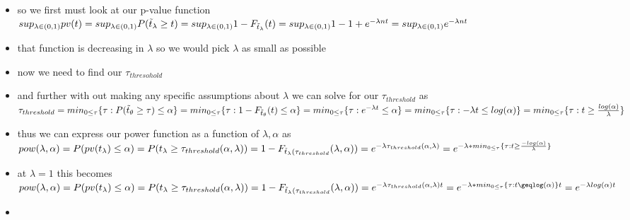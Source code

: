 \documentclass[12pt,twoside]{article}
\begin{document}
\begin{enumerate}
\begin{itemize}
\item so we first must look at our p-value function $sup_{\lambda\in (0,1)}pv(t)=sup_{\lambda\in (0,1)}P(\Tilde{t}_{\lambda}\geq t)=sup_{\lambda\in (0,1)}1-
F_{\Tilde{t}_{\lambda}}(t)=sup_{\lambda\in (0,1)}1-1+e^{-\lambda n t}=sup_{\lambda\in (0,1)}e^{-\lambda n t}$
\item that function is decreasing in $\lambda$ so we would pick $\lambda$ as small as possible
\item now we need to find our $\tau_{thresohold}$ 
\item and further with out making any specific assumptions about $\lambda$ we can solve for our $\tau_{threshold}$ as     $\tau_{threshold}=min_{0\leq \tau}\{\tau:P(\Tilde{t}_{\theta}\geq \tau)\leq \alpha\}=min_{0\leq \tau}\{\tau:1-F_{\Tilde{t}_{\theta}}(t)\leq \alpha\}=min_{0\leq \tau}\{\tau:e^{-\lambda t}\leq \alpha\}=min_{0\leq \tau}\{\tau:-\lambda t\leq log(\alpha)\}=min_{0\leq \tau}\{\tau:{t}\geq\frac{ log(\alpha)}{\lambda}\}$ 
    \item thus we can express our power function as a function of $\lambda, \alpha $ as $pow(\lambda, \alpha)=P(pv(t_{\lambda})\leq \alpha)=P(t_{\lambda}\geq \tau_{threshold}(\alpha, \lambda))=1-F_{\Tilde{t}_{\lambda}(\tau_{threshold}}(\lambda ,\alpha))= e^{-\lambda \tau_{threshold}(\alpha, \lambda)}=e^{-\lambda * min_{0\leq \tau}\{\tau:{t}\geq\frac{-log(\alpha)}{\lambda}\}}$
    \item at $\lambda=1$ this becomes $pow(\lambda, \alpha)=P(pv(t_{\lambda})\leq \alpha)=P(t_{\lambda}\geq \tau_{threshold}(\alpha, \lambda))=1-F_{\Tilde{t}_{\lambda}(\tau_{threshold}}(\lambda ,\alpha))= e^{-\lambda \tau_{threshold}(\alpha, \lambda)t}=e^{ -\lambda * min_{0\leq \tau}\{\tau:{t}\geqlog(\alpha)\}t}=e^{-\lambda log(\alpha) t}$
    \item 
\end{itemize}
\newpage





\end{enumerate}
\end{document}
